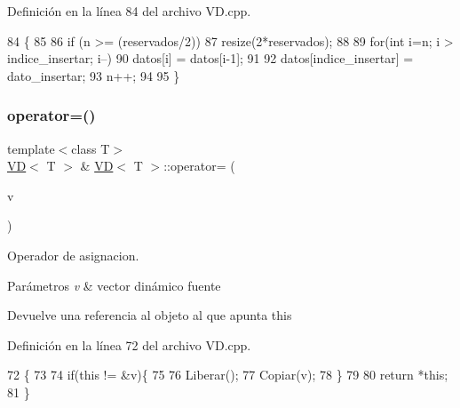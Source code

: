 Definición en la línea 84 del archivo V\+D.\+cpp.


\begin{DoxyCode}
84                                                                     \{
85     
86     \textcolor{keywordflow}{if} (n >= (reservados/2))
87         resize(2*reservados);
88     
89     \textcolor{keywordflow}{for}(\textcolor{keywordtype}{int} i=n; i > indice\_insertar; i--)
90         datos[i] = datos[i-1];
91     
92     datos[indice\_insertar] = dato\_insertar;
93     n++;
94     
95 \}
\end{DoxyCode}
\mbox{\label{classVD_a645b65a6343059cd921f6a2856c97249}} 
\subsubsection{\texorpdfstring{operator=()}{operator=()}}
{\footnotesize\ttfamily template$<$class T$>$ \\
\hyperlink{classVD}{VD}$<$ T $>$ \& \hyperlink{classVD}{VD}$<$ T $>$\+::operator= (\begin{DoxyParamCaption}\item[{const \hyperlink{classVD}{VD}$<$ T $>$ \&}]{v }\end{DoxyParamCaption})}



Operador de asignacion. 


\begin{DoxyParams}{Parámetros}
{\em v} & vector dinámico fuente \\
\hline
\end{DoxyParams}
\begin{DoxyReturn}{Devuelve}
una referencia al objeto al que apunta this 
\end{DoxyReturn}


Definición en la línea 72 del archivo V\+D.\+cpp.


\begin{DoxyCode}
72                                        \{
73     
74     \textcolor{keywordflow}{if}(\textcolor{keyword}{this} != &v)\{
75         
76         Liberar();
77         Copiar(v);
78     \}
79     
80     \textcolor{keywordflow}{return} *\textcolor{keyword}{this};
81 \}
\end{DoxyCode}
\mbox{\label{classVD_a7d80240b5791d62b7e27657763afe712}} 
